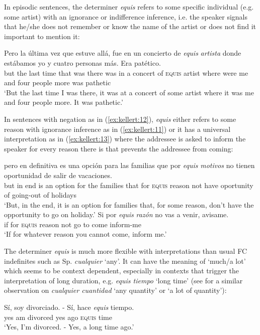 \documentclass[output=paper]{langsci/langscibook}
\begin{document}
In episodic sentences, the determiner \textit{equis} refers to some specific individual (e.g. some artist) with an ignorance or indifference inference, i.e. the speaker signals that he/she does not remember or know the name of the artist or does not find it important to mention it:

\ea\label{ex:kellert:11}
\gll  Pero la última vez que estuve allá, fue en un concierto de \textit{equis} \textit{artista} donde estábamos yo y cuatro personas más. Era patético.\\
but the last time that was there was in a concert of \textsc{equis} artist where were me and four people more was pathetic
\\
\glt ‘But the last time I was there, it was at a concert of some artist where it was me and four people more. It was pathetic.’
\z

In sentences with negation as in (\ref{ex:kellert:12}), \textit{equis} either refers to some reason with ignorance inference as in (\ref{ex:kellert:11}) or it has a universal interpretation as in (\ref{ex:kellert:13}) where the addressee is asked to inform the speaker for every reason there is that prevents the addressee from coming:

\ea \label{ex:kellert:12}
\gll  pero en definitiva es una opción para las familias que por \textit{equis} \textit{motivos} no tienen oportunidad de salir de vacaciones.\\
but in end is an option for the families that for \textsc{equis} reason not have oportunity of going-out of holidays\\
\glt ‘But, in the end, it is an option for families that, for some reason, don’t have the opportunity to go on holiday.’
\ex \label{ex:kellert:13}
\gll  Si por \textit{equis} \textit{razón} no vas a venir, avisame.\\
if for \textsc{equis} reason not go to come inform-me\\
\glt ‘If for whatever reason you cannot come, inform me.’
\z

The determiner \textit{equis} is much more flexible with interpretations than usual FC indefinites such as Sp. \textit{cualquier} ‘any’. It can have the meaning of ‘much/a lot’ which seems to be context dependent, especially in contexts that trigger the interpretation of long duration, e.g. \textit{equis tiempo} ‘long time’ (see \citealt{Rivero2011} for a similar observation on \textit{cualquier cuantidad} ‘any quantity’ or ‘a lot of quantity’):

\ea\label{ex:kellert:14}
\gll Sí, soy divorciado. - Sí, hace \textit{equis} tiempo.\\
yes am divorced {} yes ago \textsc{equis} time\\
\glt ‘Yes, I’m divorced. - Yes, a long time ago.’
\z
\end{document}
